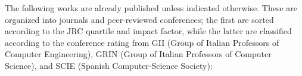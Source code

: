 \newcommand{\journalPublication}[7]{
    #2, #4. #1. #3, #7. doi: \href{#6}{#5}.
}

\newcommand{\pendingJournalPublication}[3]{
    #2, #3. #1.
}

\newcommand{\conferencePublication}[7]{
    #2, #4. #1. #3, #7. doi: \href{#6}{#5}.
}


\newcommand{\conferenceRating}[1]{Conference rating: #1.}


\normalsize
\libertineNormal
The following works are already published unless indicated otherwise. These are organized into journals and peer-reviewed conferences; the first are sorted according to the JRC quartile and impact factor, while the latter are classified according to the conference rating from GII (Group of Italian Professors of Computer Engineering), GRIN (Group of Italian Professors of Computer Science), and SCIE (Spanish Computer-Science Society):

